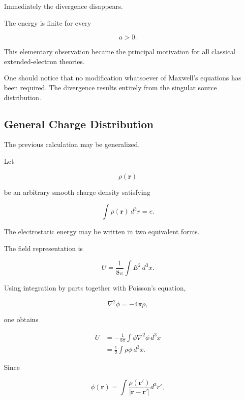 \begin{enumerate}
Immediately the divergence disappears.

The energy is finite for every

\begin{equation}
a>0.
\end{equation}

This elementary observation became the principal motivation for all classical
extended-electron theories.

One should notice that no modification whatsoever of Maxwell's equations has
been required. The divergence results entirely from the singular source
distribution.

\subsection{General Charge Distribution}

The previous calculation may be generalized.

Let

\begin{equation}
\rho(\mathbf r)
\end{equation}

be an arbitrary smooth charge density satisfying

\begin{equation}
\int
\rho(\mathbf r)\,
d^3r
=
e.
\end{equation}

The electrostatic energy may be written in two equivalent forms.

The field representation is

\begin{equation}
U
=
\frac1{8\pi}
\int
E^2\,d^3x.
\end{equation}

Using integration by parts together with Poisson's equation,

\begin{equation}
\nabla^2\phi=-4\pi\rho,
\end{equation}

one obtains

\begin{align}
U
&=
-\frac1{8\pi}
\int
\phi
\nabla^2\phi
\,d^3x
\\
&=
\frac12
\int
\rho\phi
\,d^3x.
\end{align}

Since

\begin{equation}
\phi(\mathbf r)
=
\int
\frac{\rho(\mathbf r')}
{|\mathbf r-\mathbf r'|}
d^3r',
\end{equation}


\end{enumerate}
